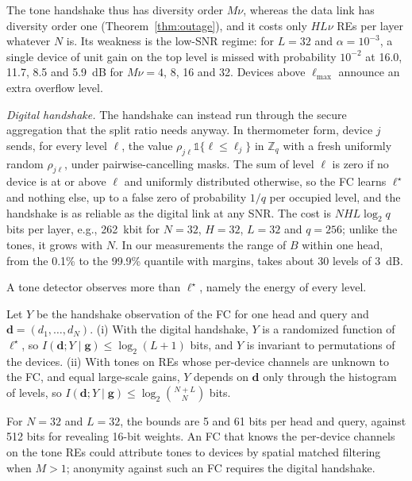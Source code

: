 The tone handshake thus has diversity order $M\nu$, whereas the data link has diversity order one (Theorem~\ref{thm:outage}), and it costs only $HL\nu$ REs per layer whatever $N$ is. Its weakness is the low-SNR regime: for $L=32$ and $\alpha=10^{-3}$, a single device of unit gain on the top level is missed with probability $10^{-2}$ at 16.0, 11.7, 8.5 and 5.9~dB for $M\nu=4$, 8, 16 and 32. Devices above $\ell_{\max}$ announce an extra overflow level.

\emph{Digital handshake.} The handshake can instead run through the secure aggregation that the split ratio needs anyway. In thermometer form, device $j$ sends, for every level $\ell$, the value $\rho_{j\ell}\mathbb{1}\{\ell\le\ell_j\}$ in $\mathbb{Z}_q$ with a fresh uniformly random $\rho_{j\ell}$, under pairwise-cancelling masks. The sum of level $\ell$ is zero if no device is at or above $\ell$ and uniformly distributed otherwise, so the FC learns $\ell^\star$ and nothing else, up to a false zero of probability $1/q$ per occupied level, and the handshake is as reliable as the digital link at any SNR. The cost is $NHL\log_2q$ bits per layer, e.g., 262~kbit for $N=32$, $H=32$, $L=32$ and $q=256$; unlike the tones, it grows with $N$. In our measurements the range of $B$ within one head, from the 0.1\% to the 99.9\% quantile with margins, takes about 30 levels of 3~dB.

A tone detector observes more than $\ell^\star$, namely the energy of every level.

\begin{proposition}\label{prop:leakage}
Let $Y$ be the handshake observation of the FC for one head and query and $\mathbf{d}=(d_1,\dots,d_N)$. (i) With the digital handshake, $Y$ is a randomized function of $\ell^\star$, so $I(\mathbf{d};Y\mid\mathbf{g})\le\log_2(L+1)$ bits, and $Y$ is invariant to permutations of the devices. (ii) With tones on REs whose per-device channels are unknown to the FC, and equal large-scale gains, $Y$ depends on $\mathbf{d}$ only through the histogram of levels, so $I(\mathbf{d};Y\mid\mathbf{g})\le\log_2\binom{N+L}{N}$ bits.
\end{proposition}

For $N=32$ and $L=32$, the bounds are 5 and 61 bits per head and query, against 512 bits for revealing 16-bit weights. An FC that knows the per-device channels on the tone REs could attribute tones to devices by spatial matched filtering when $M>1$; anonymity against such an FC requires the digital handshake.

